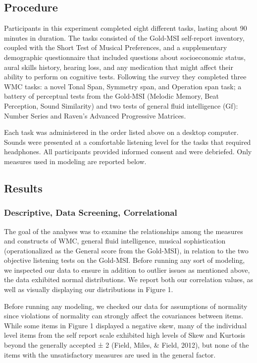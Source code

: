 \documentclass[]{book}
\theoremstyle{definition}
\theoremstyle{definition}
\theoremstyle{definition}
\theoremstyle{remark}
\begin{document}
\hypertarget{procedure}{%
\subsection{Procedure}\label{procedure}}

Participants in this experiment completed eight different tasks, lasting
about 90 minutes in duration. The tasks consisted of the Gold-MSI
self-report inventory, coupled with the Short Test of Musical
Preferences, and a supplementary demographic questionnaire that included
questions about socioeconomic status, aural skills history, hearing
loss, and any medication that might affect their ability to perform on
cognitive tests. Following the survey they completed three WMC tasks: a
novel Tonal Span, Symmetry span, and Operation span task; a battery of
perceptual tests from the Gold-MSI (Melodic Memory, Beat Perception,
Sound Similarity) and two tests of general fluid intelligence (Gf):
Number Series and Raven's Advanced Progressive Matrices.

Each task was administered in the order listed above on a desktop
computer. Sounds were presented at a comfortable listening level for the
tasks that required headphones. All participants provided informed
consent and were debriefed. Only measures used in modeling are reported
below.

\hypertarget{results}{%
\subsection{Results}\label{results}}

\hypertarget{descriptive-data-screening-correlational}{%
\subsubsection{Descriptive, Data Screening,
Correlational}\label{descriptive-data-screening-correlational}}

The goal of the analyses was to examine the relationships among the
measures and constructs of WMC, general fluid intelligence, musical
sophistication (operationalized as the General score from the Gold-MSI),
in relation to the two objective listening tests on the Gold-MSI. Before
running any sort of modeling, we inspected our data to ensure in
addition to outlier issues as mentioned above, the data exhibited normal
distributions. We report both our correlation values, as well as
visually displaying our distributions in Figure 1.

Before running any modeling, we checked our data for assumptions of
normality since violations of normality can strongly affect the
covariances between items. While some items in Figure 1 displayed a
negative skew, many of the individual level items from the self report
scale exhibited high levels of Skew and Kurtosis beyond the generally
accepted ± 2 (Field, Miles, \& Field, 2012), but none of the items with
the unsatisfactory measures are used in the general factor.
\end{document}
